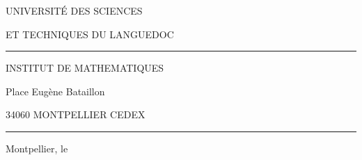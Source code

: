 
UNIVERSITÉ DES SCIENCES

ET TECHNIQUES DU LANGUEDOC

\rule{1cm}{.4pt}

INSTITUT DE MATHEMATIQUES

Place Eugène Bataillon

34060 MONTPELLIER CEDEX

\rule{1cm}{.4pt}

Montpellier, le
